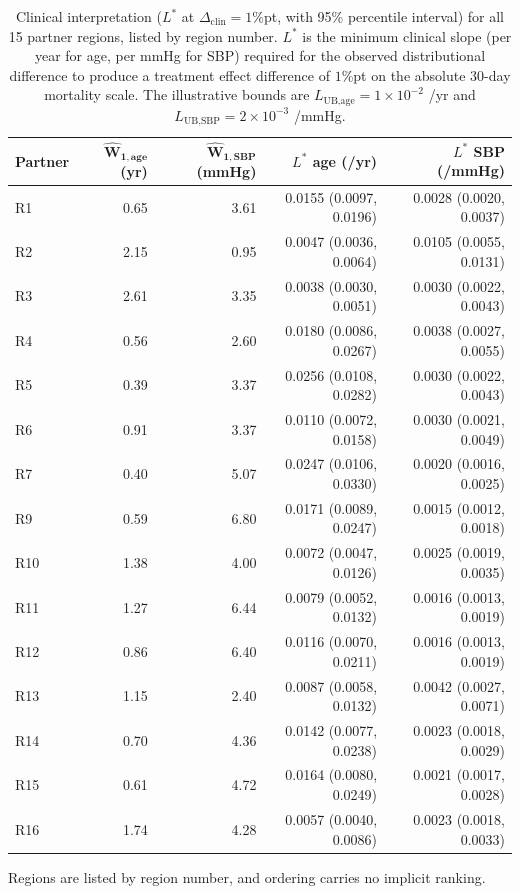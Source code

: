 \documentclass[AMA,Times1COL]{WileyNJDv5}
\begin{document}
\begin{table}[ht]
\centering
\caption{Clinical interpretation ($L^*$ at $\Delta_{\text{clin}} = 1$\%pt, with 95\% percentile interval) for all 15 partner regions, listed by region number. $L^*$ is the minimum clinical slope (per year for age, per mmHg for SBP) required for the observed distributional difference to produce a treatment effect difference of $1$\%pt on the absolute 30-day mortality scale. The illustrative bounds are $L_{\text{UB,age}} = 1\times10^{-2}$ /yr and $L_{\text{UB,SBP}} = 2\times10^{-3}$ /mmHg.\label{tab:gusto_lstar_joint}}
\begin{tabular}{lrrrr}
\toprule
\textbf{Partner} & $\boldsymbol{\widehat{W}_{1,\text{age}}}$ \textbf{(yr)} & $\boldsymbol{\widehat{W}_{1,\text{SBP}}}$ \textbf{(mmHg)} & \textbf{$L^*$ age (/yr)} & \textbf{$L^*$ SBP (/mmHg)} \\
\midrule
R1  & 0.65 & 3.61 & 0.0155 (0.0097, 0.0196) & 0.0028 (0.0020, 0.0037) \\
R2  & 2.15 & 0.95 & 0.0047 (0.0036, 0.0064) & 0.0105 (0.0055, 0.0131) \\
R3  & 2.61 & 3.35 & 0.0038 (0.0030, 0.0051) & 0.0030 (0.0022, 0.0043) \\
R4  & 0.56 & 2.60 & 0.0180 (0.0086, 0.0267) & 0.0038 (0.0027, 0.0055) \\
R5  & 0.39 & 3.37 & 0.0256 (0.0108, 0.0282) & 0.0030 (0.0022, 0.0043) \\
R6  & 0.91 & 3.37 & 0.0110 (0.0072, 0.0158) & 0.0030 (0.0021, 0.0049) \\
R7  & 0.40 & 5.07 & 0.0247 (0.0106, 0.0330) & 0.0020 (0.0016, 0.0025) \\
R9  & 0.59 & 6.80 & 0.0171 (0.0089, 0.0247) & 0.0015 (0.0012, 0.0018) \\
R10 & 1.38 & 4.00 & 0.0072 (0.0047, 0.0126) & 0.0025 (0.0019, 0.0035) \\
R11 & 1.27 & 6.44 & 0.0079 (0.0052, 0.0132) & 0.0016 (0.0013, 0.0019) \\
R12 & 0.86 & 6.40 & 0.0116 (0.0070, 0.0211) & 0.0016 (0.0013, 0.0019) \\
R13 & 1.15 & 2.40 & 0.0087 (0.0058, 0.0132) & 0.0042 (0.0027, 0.0071) \\
R14 & 0.70 & 4.36 & 0.0142 (0.0077, 0.0238) & 0.0023 (0.0018, 0.0029) \\
R15 & 0.61 & 4.72 & 0.0164 (0.0080, 0.0249) & 0.0021 (0.0017, 0.0028) \\
R16 & 1.74 & 4.28 & 0.0057 (0.0040, 0.0086) & 0.0023 (0.0018, 0.0033) \\
\bottomrule
\end{tabular}
\begin{tablenotes}
\item Regions are listed by region number, and ordering carries no implicit ranking.
\end{tablenotes}
\end{table}
\end{document}
